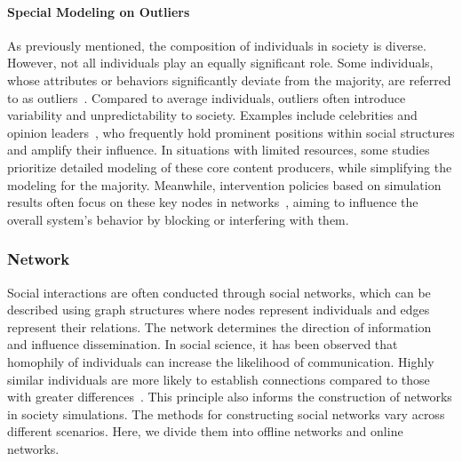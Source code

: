 \paragraph{Special Modeling on Outliers} 
As previously mentioned, the composition of individuals in society is diverse. However, not all individuals play an equally significant role. Some individuals, whose attributes or behaviors significantly deviate from the majority, are referred to as outliers~\cite{squazzoni2014social}. Compared to average individuals, outliers often introduce variability and unpredictability to society. Examples include celebrities and opinion leaders~\cite{zhang2024large,xu2024mindechoroleplayinglanguageagents}, who frequently hold prominent positions within social structures and amplify their influence. In situations with limited resources, some studies~\cite{mou2024unveiling} prioritize detailed modeling of these core content producers, while simplifying the modeling for the majority. Meanwhile, intervention policies based on simulation results often focus on these key nodes in networks~\cite{li2024large}, aiming to influence the overall system's behavior by blocking or interfering with them.


\subsubsection{Network}
Social interactions are often conducted through social networks, which can be described using graph structures where nodes represent individuals and edges represent their relations. The network determines the direction of information and influence dissemination. In social science, it has been observed that homophily of individuals can increase the likelihood of communication. Highly similar individuals are more likely to establish connections compared to those with greater differences~\cite{brown1987social,kossinets2009origins}. This principle also informs the construction of networks in society simulations. The methods for constructing social networks vary across different scenarios. Here, we divide them into offline networks and online networks.

